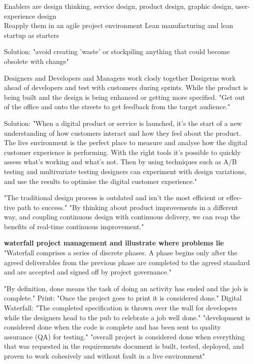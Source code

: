 Enablers are design thinking, service design, product design, graphic design, user-experience design\\
Reapply them in an agile project environment \citep{ratcliffe2011agile:12}
Lean manufacturing and lean startup as starters

Solution: "avoid creating 'waste' or stockpiling anything that could become obsolete with change" \citep{ratcliffe2011agile:12} 

Designers and Developers and Managers work closly together
Desigerns work ahead of developers and test with customers during sprints.
While the product is being built and the design is being enhanced or getting more specified.
"Get out of the office and onto the streets to get feedback from the target audience." \citep{ratcliffe2011agile:13}

Solution: "When a digital product or service is launched, it’s the start of a new understanding of how customers interact and how they feel about the product. The live environment is the perfect place to measure and analyse how the digital customer experience is performing. With the right tools it’s possible to quickly assess what’s working and what’s not. Then by using techniques such as A/B testing and multivariate testing designers can experiment with design variations, and use the results to optimise the digital customer experience." \citep{ratcliffe2011agile:14}

"The traditional design process is outdated and isn’t the most efficient or effec- tive path to success." \citep{ratcliffe2011agile:14}
"By thinking about product improvements in a different way, and coupling continuous design with continuous delivery, we can reap the benefits of real-time continuous improvement." \citep{ratcliffe2011agile:14}


\textbf{waterfall project management and illustrate where problems lie}
"Waterfall comprises a series of discrete phases. A phase begins only after the agreed deliverables from the previous phase are completed to the agreed standard and are accepted and signed off by project governance." \citep{ratcliffe2011agile:18}

"By definition, done means the task of doing an activity has ended and the job is complete." \citep{ratcliffe2011agile:18}
Print: 
"Once the project goes to print it is considered done." \citep{ratcliffe2011agile:18}
Digital Waterfall: 
"The completed specification is thrown over the wall for developers while the designers head to the pub to celebrate a job well done." \citep{ratcliffe2011agile:19}
"development is considered done when the code is complete and has been sent to quality assurance (QA) for testing." \citep{ratcliffe2011agile:19}
"overall project is considered done when everything that was requested in the requirements document is built, tested, deployed, and proven to work cohesively and without fault in a live environment" \citep{ratcliffe2011agile:19}

